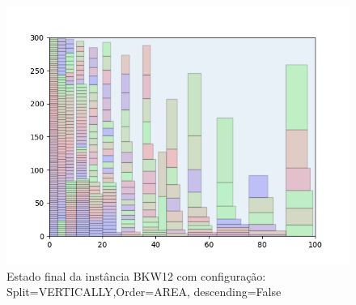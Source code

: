 \begin{figure}[H]
    \centering
    \caption[]{Estado final da instância BKW12 com configuração: Split=VERTICALLY,Order=AREA, descending=False}
    \label{fig:bkw12-vertically-area-false}
    \includegraphics[scale=0.5]{output/figures/bkw/bkw12/vertically/area/false/000}
\end{figure}